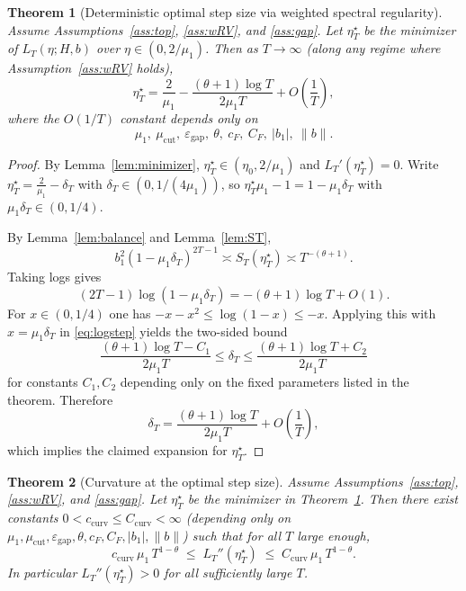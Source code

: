 \documentclass[11pt]{article}
\newtheorem{theorem}{Theorem}
\begin{document}
\begin{theorem}[Deterministic optimal step size via weighted spectral regularity]\label{thm:det}
Assume Assumptions~\ref{ass:top}, \ref{ass:wRV}, and \ref{ass:gap}. Let $\eta_T^\star$ be the minimizer
of $L_T(\eta;H,b)$ over $\eta\in(0,2/\mu_1)$. Then as $T\to\infty$ (along any regime where
Assumption~\ref{ass:wRV} holds),
\[
\eta_T^\star
=
\frac{2}{\mu_1}
-\frac{(\theta+1)\log T}{2\mu_1 T}
+O\!\left(\frac{1}{T}\right),
\]
where the $O(1/T)$ constant depends only on
\[
\mu_1,\ \mu_{\mathrm{cut}},\ \varepsilon_{\mathrm{gap}},\ \theta,\ c_F,\ C_F,\ |b_1|,\ \|b\|.
\]
\end{theorem}

\begin{proof}
By Lemma~\ref{lem:minimizer}, $\eta_T^\star\in(\eta_0,2/\mu_1)$ and $L_T'(\eta_T^\star)=0$.
Write $\eta_T^\star=\frac{2}{\mu_1}-\delta_T$ with $\delta_T\in(0,1/(4\mu_1))$,
so $\eta_T^\star\mu_1-1=1-\mu_1\delta_T$ with $\mu_1\delta_T\in(0,1/4)$.

By Lemma~\ref{lem:balance} and Lemma~\ref{lem:ST},
\[
b_1^2(1-\mu_1\delta_T)^{2T-1}\asymp S_T(\eta_T^\star)\asymp T^{-(\theta+1)}.
\]
Taking logs gives
\begin{equation}\label{eq:logstep}
(2T-1)\log(1-\mu_1\delta_T)=-(\theta+1)\log T+O(1).
\end{equation}
For $x\in(0,1/4)$ one has $-x-x^2\le \log(1-x)\le -x$. Applying this with $x=\mu_1\delta_T$
in \eqref{eq:logstep} yields the two-sided bound
\[
\frac{(\theta+1)\log T-C_1}{2\mu_1 T}\le \delta_T\le \frac{(\theta+1)\log T+C_2}{2\mu_1 T}
\]
for constants $C_1,C_2$ depending only on the fixed parameters listed in the theorem.
Therefore
\[
\delta_T=\frac{(\theta+1)\log T}{2\mu_1 T}+O\!\left(\frac{1}{T}\right),
\]
which implies the claimed expansion for $\eta_T^\star$.
\end{proof}

\begin{theorem}[Curvature at the optimal step size]\label{thm:det-curv}
Assume Assumptions~\ref{ass:top}, \ref{ass:wRV}, and \ref{ass:gap}. Let $\eta_T^\star$ be the minimizer in
Theorem~\ref{thm:det}. Then there exist constants $0<c_{\mathrm{curv}}\le C_{\mathrm{curv}}<\infty$
(depending only on $\mu_1,\mu_{\mathrm{cut}},\varepsilon_{\mathrm{gap}},\theta,c_F,C_F,|b_1|,\|b\|$) such that for all
$T$ large enough,
\[
c_{\mathrm{curv}}\,\mu_1\,T^{1-\theta}
\;\le\;
L_T''(\eta_T^\star)
\;\le\;
C_{\mathrm{curv}}\,\mu_1\,T^{1-\theta}.
\]
In particular $L_T''(\eta_T^\star)>0$ for all sufficiently large $T$.
\end{theorem}
\end{document}
